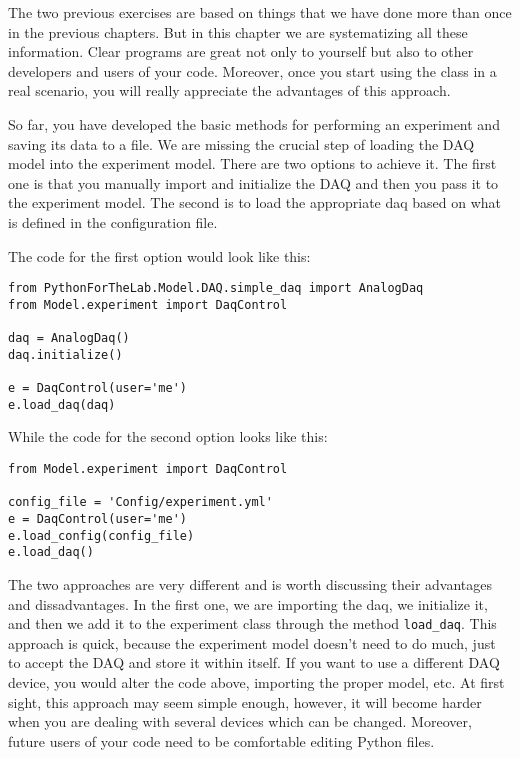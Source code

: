 {The two previous exercises are based on things that we have done more than once in the previous chapters. But in this chapter we are systematizing all these information. Clear programs are great not only to yourself but also to other developers and users of your code. Moreover, once you start using the class in a real scenario, you will really appreciate the advantages of this approach.


So far, you have developed the basic methods for performing an experiment and saving its data to a file. We are missing the crucial step of loading the {DAQ} model into the experiment model. There are two options to achieve it. The first one is that you manually import and initialize the {DAQ} and then you pass it to the experiment model. The second is to load the appropriate daq based on what is defined in the configuration file.

The code for the first option would look like this:

\begin{verbatim}
from PythonForTheLab.Model.DAQ.simple_daq import AnalogDaq
from Model.experiment import DaqControl

daq = AnalogDaq()
daq.initialize()

e = DaqControl(user='me')
e.load_daq(daq)
\end{verbatim}

While the code for the second option looks like this:

\begin{verbatim}
from Model.experiment import DaqControl

config_file = 'Config/experiment.yml'
e = DaqControl(user='me')
e.load_config(config_file)
e.load_daq()
\end{verbatim}

The two approaches are very different and is worth discussing their advantages and dissadvantages. In the first one, we are
importing the daq, we initialize it, and then we add it to the experiment class through the method \texttt{load\_daq}. This approach is quick, because the experiment model doesn't need to do much, just to accept the DAQ and store it within itself. If you want to use a different DAQ device, you would alter the code above, importing the proper model, etc. At first sight, this approach may seem simple enough, however, it will become harder when you are dealing with several devices which can be changed. Moreover, future users of your code need to be comfortable editing Python files. 

}
